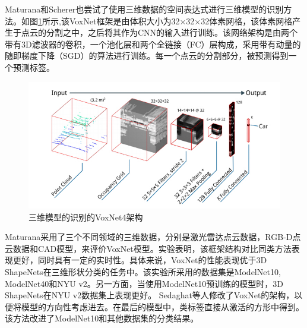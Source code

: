 Maturana和Scherer\cite{Maturana2015VoxNet}也尝试了使用三维数据的空间表达式进行三维模型的识别方法。如图\ref{fig_Maturana}所示,该VoxNet框架是由体积大小为32×32×32体素网格，该体素网格产生于点云的分割之中，之后将其作为CNN的输入进行训练。该网络架构是由两个带有3D滤波器的卷积，一个池化层和两个全链接（FC）层构成，采用带有动量的随即梯度下降（SGD）的算法进行训练。每一个点云的分割部分，被预测得到一个预测标签。
\begin{figure}[tb]
\begin{center}
\includegraphics[width=0.9\linewidth]{figures/Maturana.jpg} 
\end{center} 
\vspace{-4mm}
\caption{三维模型的识别的VoxNet4架构} 
\label{fig_Maturana}
\end{figure}
Maturana采用了三个不同领域的三维数据，分别是激光雷达点云数据，RGB-D点云数据和CAD模型，来评价VoxNet模型。实验表明，该框架结构对比同类方法表现更好，同时具有一定的实时性。具体来说，VoxNet的性能表现优于3D ShapeNets\cite{Wu20143D}在三维形状分类的任务中。该实验所采用的数据集是ModelNet10, ModelNet40和NYU v2\cite{Silberman2012Indoor}。另一方面，当使用ModelNet10预训练的模型时，3D ShapeNets在NYU v2数据集上表现更好。 Sedaghat等人\cite{Sedaghat2016Orientation}修改了VoxNet的架构，以便将模型的方向性考虑进去。在最后的模型中，类标签直接从激活的方形中得到。 该方法改进了ModelNet10和其他数据集的分类结果。

